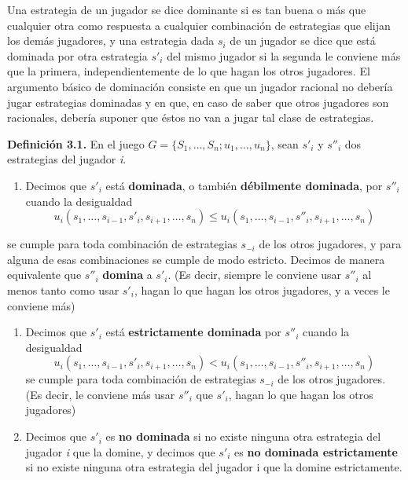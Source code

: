 \documentclass[12pt,a4paper,]{book}
\providecommand{\tightlist}{%
  \setlength{\itemsep}{0pt}\setlength{\parskip}{0pt}}
\numberwithin{dummy}{section}
\theoremstyle{ocrenumbox}
\theoremstyle{blacknumex}
\theoremstyle{blacknumbox}
\theoremstyle{ocrenum}
\theoremstyle{ocrenum}
\begin{document}
Una estrategia de un jugador se dice dominante si es tan buena o más que
cualquier otra como respuesta a cualquier combinación de estrategias que
elijan los demás jugadores, y una estrategia dada \(s_i\) de un jugador
se dice que está dominada por otra estrategia \(s'_i\) del mismo jugador
si la segunda le conviene más que la primera, independientemente de lo
que hagan los otros jugadores. El argumento básico de dominación
consiste en que un jugador racional no debería jugar estrategias
dominadas y en que, en caso de saber que otros jugadores son racionales,
debería suponer que éstos no van a jugar tal clase de estrategias.

\textbf{Definición 3.1.} En el juego
\(G = \{S_1, \ldots, S_n; u_1,\ldots,u_n\}\), sean \(s'_i\) y \(s''_i\)
dos estrategias del jugador \emph{i}.

\begin{enumerate}
\def\labelenumi{\alph{enumi})}
\tightlist
\item
  Decimos que \(s'_i\) está \textbf{dominada}, o también
  \textbf{débilmente dominada}, por \(s''_i\) cuando la desigualdad
  \[u_i(s_1,\ldots,s_{i-1},s'_i,s_{i+1},\ldots,s_n)\le u_i(s_1,\ldots,s_{i-1},s''_i,s_{i+1},\ldots,s_n)\]
\end{enumerate}

se cumple para toda combinación de estrategias \(s_{-i}\) de los otros
jugadores, y para alguna de esas combinaciones se cumple de modo
estricto. Decimos de manera equivalente que \(s''_i\) \textbf{domina} a
\(s'_i\). (Es decir, siempre le conviene usar \(s''_i\) al menos tanto
como usar \(s'_i\), hagan lo que hagan los otros jugadores, y a veces le
conviene más)

\begin{enumerate}
\def\labelenumi{\alph{enumi})}
\setcounter{enumi}{1}
\item
  Decimos que \(s'_i\) está \textbf{estrictamente dominada} por
  \(s''_i\) cuando la desigualdad
  \[u_i(s_1,\ldots,s_{i-1},s'_i,s_{i+1},\ldots,s_n)<u_i(s_1,\ldots,s_{i-1},s''_i,s_{i+1},\ldots,s_n)\]
  se cumple para toda combinación de estrategias \(s_{-i}\) de los otros
  jugadores. (Es decir, le conviene más usar \(s''_i\) que \(s'_i\),
  hagan lo que hagan los otros jugadores)
\item
  Decimos que \(s'_i\) es \textbf{no dominada} si no existe ninguna otra
  estrategia del jugador \emph{i} que la domine, y decimos que \(s'_i\)
  es \textbf{no dominada estrictamente} si no existe ninguna otra
  estrategia del jugador i que la domine estrictamente.
\end{enumerate}
\end{document}
